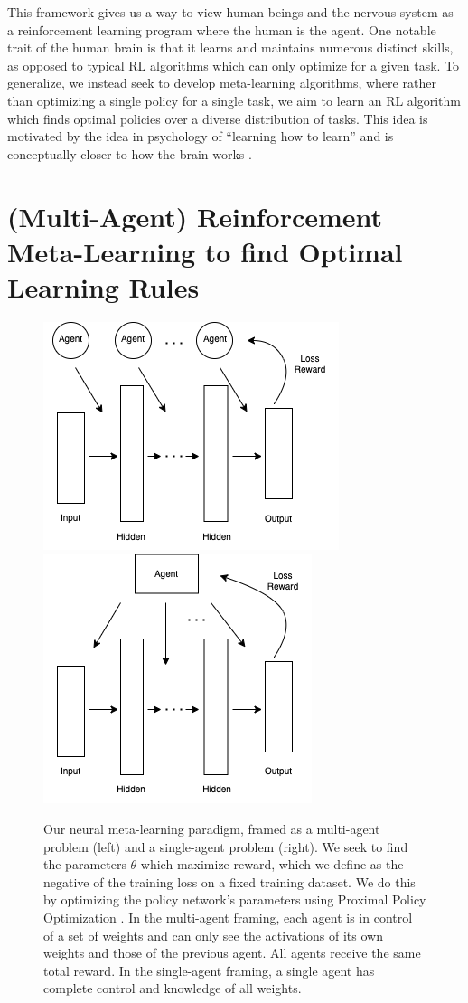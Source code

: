 \documentclass{article}
\begin{document}
This framework gives us a way to view human beings and the nervous system as a 
reinforcement learning program where the human is the agent. One notable trait of the human brain is that it learns and maintains numerous distinct skills, as opposed to typical RL algorithms which can only optimize for a given task. To generalize, we instead seek to develop meta-learning algorithms, 
where rather than optimizing a single policy for a single task,
we aim to learn an RL algorithm which finds optimal policies over a diverse distribution 
of tasks. This idea is motivated by the idea in psychology of 
 ``learning how to learn'' and is conceptually closer to how the brain 
works \cite{wang2018pfc}.

\section{(Multi-Agent) Reinforcement Meta-Learning to find Optimal Learning Rules}


\begin{figure}
  \centering
  \includegraphics[scale=0.6]{marlnn} \includegraphics[scale=0.6]{singleagent}
  \caption{Our neural meta-learning paradigm, framed as a multi-agent problem (left) and a single-agent problem (right). We seek to find the parameters $\theta$ which maximize reward, which we define as the negative of the training loss on a fixed training dataset. We do this by optimizing the policy network's parameters using Proximal Policy Optimization \cite{schulman_ppo}. In the multi-agent framing, each agent is in control of a set of weights and can only see the activations of its own weights and those of the previous agent. All agents receive the same total reward. In the single-agent framing, a single agent has complete control and knowledge of all weights.   \label{fig:meta-rl}}
\end{figure}
 
\end{document}
